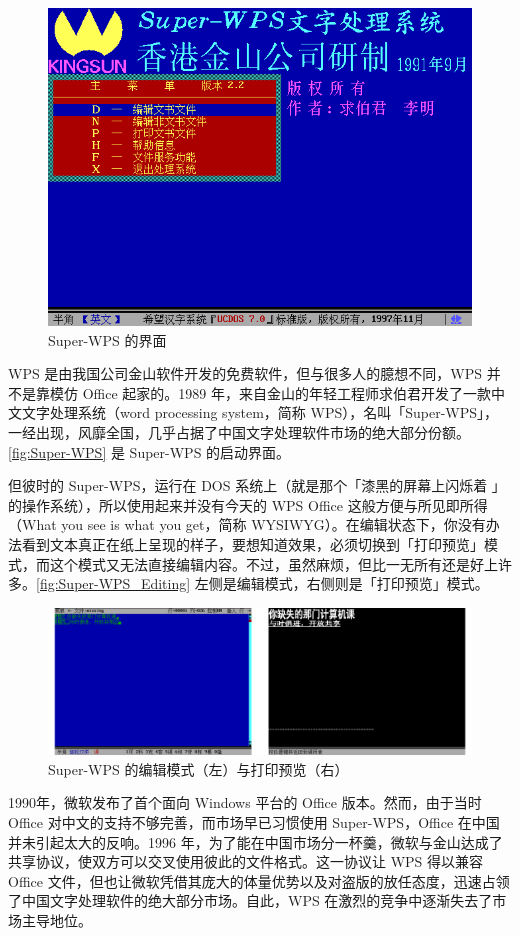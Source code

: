 \begin{figure}[htb!]
  \centering
  \includegraphics[width=.5\textwidth]{assets/software/Super-WPS.png}
  \caption{Super-WPS 的界面}
  \label{fig:Super-WPS}
\end{figure}

WPS 是由我国公司金山软件开发的免费软件，但与很多人的臆想不同，WPS 并不是靠模仿 Office 起家的。1989 年，来自金山的年轻工程师求伯君开发了一款中文文字处理系统（word processing system，简称 WPS），名叫「Super-WPS」，一经出现，风靡全国，几乎占据了中国文字处理软件市场的绝大部分份额。\autoref{fig:Super-WPS} 是 Super-WPS 的启动界面。

但彼时的 Super-WPS，运行在 DOS 系统上（就是那个「漆黑的屏幕上闪烁着 」的操作系统），所以使用起来并没有今天的 WPS Office 这般方便与所见即所得（What you see is what you get，简称 WYSIWYG）。在编辑状态下，你没有办法看到文本真正在纸上呈现的样子，要想知道效果，必须切换到「打印预览」模式，而这个模式又无法直接编辑内容。不过，虽然麻烦，但比一无所有还是好上许多。\autoref{fig:Super-WPS_Editing} 左侧是编辑模式，右侧则是「打印预览」模式。

\begin{figure}[htb!]
  \centering
  \includegraphics[width=.98\textwidth]{assets/software/Super-WPS_Editing.png}
  \caption{Super-WPS 的编辑模式（左）与打印预览（右）}
  \label{fig:Super-WPS_Editing}
\end{figure}

1990年，微软发布了首个面向 Windows 平台的 Office 版本。然而，由于当时 Office 对中文的支持不够完善，而市场早已习惯使用 Super-WPS，Office 在中国并未引起太大的反响。1996 年，为了能在中国市场分一杯羹，微软与金山达成了共享协议，使双方可以交叉使用彼此的文件格式。这一协议让 WPS 得以兼容 Office 文件，但也让微软凭借其庞大的体量优势以及对盗版的放任态度，迅速占领了中国文字处理软件的绝大部分市场。自此，WPS 在激烈的竞争中逐渐失去了市场主导地位。

